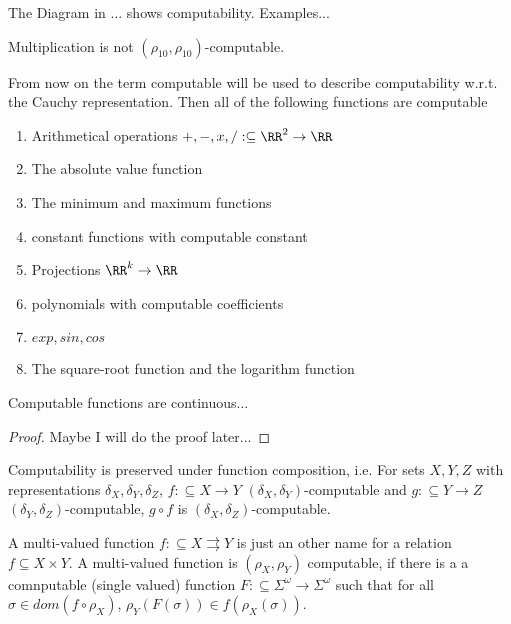 The Diagram in ... shows computability.
Examples...
\begin{theorem}
Multiplication is not $(\rho_{10}, \rho_{10})$-computable.
\end{theorem}
From now on the term computable will be used to describe computability w.r.t. the Cauchy representation.
Then all of the following functions are computable
\begin{enumerate}
\item Arithmetical operations $+,-,x,/ : \subseteq \RR^2 \to \RR$
\item The absolute value function
\item The minimum and maximum functions
\item constant functions with computable constant
\item Projections $\RR^k \to \RR$ 
\item polynomials with computable coefficients
\item $exp, sin, cos$
\item The square-root function and the logarithm function
\end{enumerate}
\begin{theorem}
	Computable functions are continuous...
	\begin{proof}
		Maybe I will do the proof later...
	\end{proof}
\end{theorem}

\begin{theorem}
Computability is preserved under function composition, i.e.
For sets $X,Y,Z$ with representations $\delta_X, \delta_Y, \delta_Z$, 
$f:\subseteq X \to Y$ $(\delta_X, \delta_Y)$-computable and $g:\subseteq Y \to Z$ $(\delta_Y, \delta_Z)$-computable,
$g \circ f$ is $(\delta_X, \delta_Z)$-computable.
\end{theorem}
\begin{definition}
A multi-valued function $f: \subseteq X \rightrightarrows Y$ is just an other name for a relation $f \subseteq X \times Y$.
A multi-valued function is $(\rho_X, \rho_Y)$ computable, if there is a a comnputable (single valued) function 
$F: \subseteq \Sigma^\omega \to \Sigma^\omega$ such that for all $\sigma \in dom(f \circ \rho_X)$, $\rho_Y(F(\sigma)) \in f(\rho_X(\sigma))$. 
\end{definition}
